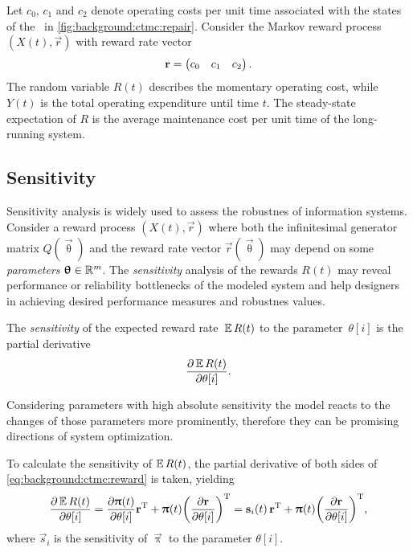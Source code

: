 \begin{example}
  Let $c_0$, $c_1$ and $c_2$ denote operating costs per unit time
  associated with the states of the \CTMC\ in
  \cref{fig:background:ctmc:repair}. Consider the Markov reward
  process $(X(t), \vec{r})$ with reward rate vector
  \begin{equation}
    \vec{r} = \begin{pmatrix} c_0 & c_1 & c_2 \end{pmatrix} \text.
  \end{equation}
  The random variable $R(t)$ describes the momentary operating cost,
  while $Y(t)$ is the total operating expenditure until time $t$. The
  steady-state expectation of $R$ is the average maintenance cost per
  unit time of the long-running system.
\end{example}

\subsection{Sensitivity}

Sensitivity analysis is widely used to assess the robustnes of
information systems.  Consider a reward process $(X(t), \vec{r})$
where both the infinitesimal generator matrix $Q(\vec{\uptheta})$ and
the reward rate vector $\vec{r}(\vec{\uptheta})$ may depend on some
\emph{parameters} $\vec{\uptheta} \in \RR^m$. The \emph{sensitivity}
analysis of the rewards $R(t)$ may reveal performance or reliability
bottlenecks of the modeled system and help designers in achieving
desired performance measures and robustnes values.

\begin{dfn}
  The \emph{sensitivity} of the expected reward rate~$\Ex R(t)$ to the
  parameter~$\theta[i]$ is the partial derivative
  \begin{equation}
    \frac{\partial \Ex R(t)}{\partial \theta[i]} \text.
  \end{equation}
\end{dfn}

Considering parameters with high absolute sensitivity the model reacts to the changes of those parameters more prominently, therefore they can be promising directions of system optimization.

To calculate the sensitivity of $\Ex R(t)$, the partial derivative of
both sides of \cref{eq:background:ctmc:reward} is taken, yielding
\begin{equation}
  \label{eq:background:ctmc:sensitivity:productrule}
  \frac{\partial \Ex R(t)}{\partial \theta[i]} = \frac{\partial
    \vec{\uppi}(t)}{\partial \theta[i]} \vec{r}^\T + \vec{\uppi}(t)
  \mleft(\frac{\partial \vec{r}}{\partial \theta[i]}\mright)^\T =
  \vec{s}_i(t) \, \vec{r}^\T + \vec{\uppi}(t)
  \mleft(\frac{\partial \vec{r}}{\partial \theta[i]}\mright)^\T \text,
\end{equation}
where $\vec{s}_i$ is the sensitivity of $\vec{\uppi}$ to the parameter
$\theta[i]$.

